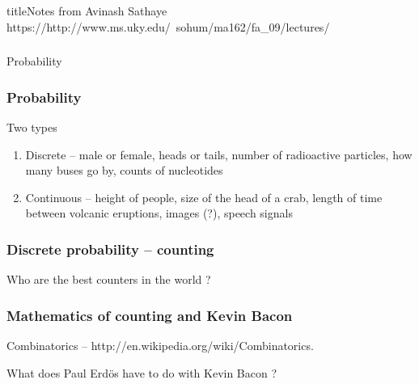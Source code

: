 \begin{frame}[fragile]title{Notes from Avinash Sathaye}
https://http://www.ms.uky.edu/~sohum/ma162/fa\_09/lectures/
\end{frame}


\begin{frame}[fragile]\frametitle{}
\begin{center}
{\Large Probability}

\end{center}
\end{frame}


\begin{frame}[fragile]\frametitle{Probability}

Two types
\begin{enumerate}
\item Discrete -- male or female, heads or tails, number of
  radioactive particles, how many buses go by, counts of nucleotides 

\item Continuous -- height of people, size of the head of a crab, 
length of time between volcanic eruptions, images (?), speech
signals

\end{enumerate}
\end{frame}


\begin{frame}[fragile]\frametitle{Discrete probability -- counting}

Who are the best counters in the world ? 



\end{frame}

\begin{frame}[fragile]\frametitle{Mathematics of counting and Kevin Bacon}

Combinatorics -- http://en.wikipedia.org/wiki/Combinatorics. 

\vspace{.3in}

What does Paul Erd\"{o}s have to do with Kevin Bacon ?

\end{frame}


